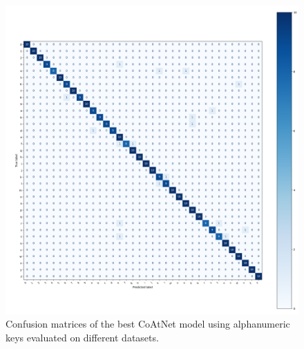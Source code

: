 \documentclass[a4paper,11pt,twoside]{report}
\theoremstyle{definition}
\begin{document}
\begin{figure}[H]
\begin{minipage}{0.49\linewidth}
  \end{minipage}
  \hfill
  \begin{minipage}{0.49\linewidth}
      \centering
      \includegraphics[width=\linewidth]{img_appendix/cm_all_alphanum_p.png}
  \end{minipage}
  \caption{Confusion matrices of the best CoAtNet model using alphanumeric keys evaluated on different datasets.}
\end{figure}
\end{document}
